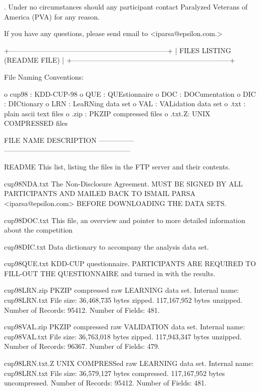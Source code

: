 \documentclass[
  11pt,
  a4paper,
  DIV=12,captions=tableheading,oneside,titlepage]{scrbook}
\let\oldverbatim\verbatim
\let\endoldverbatim\endverbatim
\renewenvironment{verbatim}{\footnotesize\oldverbatim}{\endoldverbatim}
\begin{document}
\begin{verbatim}
10. Under no circumstances should any participant contact Paralyzed
Veterans of America (PVA) for any reason.

If you have any questions, please send email to <iparsa@epsilon.com.>

+--------------------------------------------------------------------+
| FILES LISTING (README FILE)                                        |
+--------------------------------------------------------------------+

File Naming Conventions: 

o cup98         : KDD-CUP-98 
o      QUE      : QUEstionnaire 
o      DOC      : DOCumentation
o      DIC      : DICtionary
o      LRN      : LeaRNing data set 
o      VAL      : VALidation data set 
o         .txt  : plain ascii text files
o         .zip  : PKZIP compressed files
o         .txt.Z: UNIX COMPRESSED files

FILE NAME       DESCRIPTION
--------------- ------------------------------------------------------

README          This list, listing the files in the FTP server and 
                their contents.

cup98NDA.txt    The Non-Disclosure Agreement. MUST BE SIGNED BY ALL 
                PARTICIPANTS AND MAILED BACK TO ISMAIL PARSA 
                <iparsa@epsilon.com> BEFORE DOWNLOADING THE DATA SETS.

cup98DOC.txt    This file, an overview and pointer to more detailed 
                information about the competition

cup98DIC.txt    Data dictionary to accompany the analysis data set. 

cup98QUE.txt    KDD-CUP questionnaire. PARTICIPANTS ARE REQUIRED TO
                FILL-OUT THE QUESTIONNAIRE and turned in
                with the results. 

cup98LRN.zip    PKZIP compressed raw LEARNING data set. 
                Internal name: cup98LRN.txt 
                File size: 36,468,735 bytes zipped. 117,167,952 bytes 
                unzipped.
                Number of Records: 95412.
                Number of Fields: 481.

cup98VAL.zip    PKZIP compressed raw VALIDATION data set. 
                Internal name: cup98VAL.txt 
                File size: 36,763,018 bytes zipped. 117,943,347 bytes 
                unzipped.
                Number of Records: 96367.
                Number of Fields: 479.
 
cup98LRN.txt.Z  UNIX COMPRESSed raw LEARNING data set. 
                Internal name: cup98LRN.txt 
                File size: 36,579,127 bytes compressed. 117,167,952 
                bytes uncompressed.
                Number of Records: 95412.
                Number of Fields: 481.


\end{verbatim}
\end{document}
